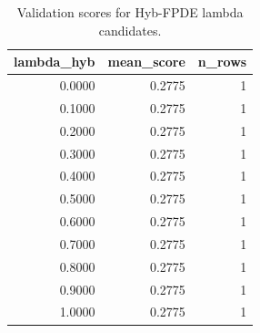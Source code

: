 \begin{table}[t]
\caption{Validation scores for Hyb-FPDE lambda candidates.}
\label{tab:lambda_distribution_computed}
\centering
\begin{tabular}{rrr}
\toprule
lambda\_hyb & mean\_score & n\_rows \\
\midrule
0.0000 & 0.2775 & 1 \\
0.1000 & 0.2775 & 1 \\
0.2000 & 0.2775 & 1 \\
0.3000 & 0.2775 & 1 \\
0.4000 & 0.2775 & 1 \\
0.5000 & 0.2775 & 1 \\
0.6000 & 0.2775 & 1 \\
0.7000 & 0.2775 & 1 \\
0.8000 & 0.2775 & 1 \\
0.9000 & 0.2775 & 1 \\
1.0000 & 0.2775 & 1 \\
\bottomrule
\end{tabular}

\end{table}
